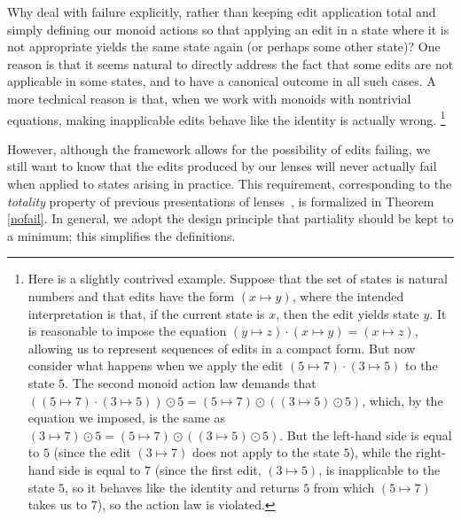 Why deal with failure explicitly, rather than keeping edit application total
and simply defining our monoid actions so that applying an edit in a state
where it is not appropriate yields the same state again (or perhaps some
other state)?  One reason is that it seems natural to directly address the
fact that some edits are not applicable in some states, and to have a
canonical outcome in all such cases.  A more technical reason is that, when
we work with monoids with nontrivial equations, making inapplicable edits
behave like the identity is actually
wrong.%
%
\footnote{Here is a slightly contrived example.  Suppose that the set of
  states is natural numbers and that edits have the form $(x\mapsto y)$,
  where the intended interpretation is that, if the current state is $x$,
  then the edit yields state $y$.  It is reasonable to impose the equation
  $(y\mapsto z)\cdot(x\mapsto y) = (x\mapsto z)$, allowing us to represent
  sequences of edits in a compact form.  But now consider what happens when
  we apply the edit $(5\mapsto 7)\cdot(3\mapsto 5)$ to the state $5$.  The
  second monoid action law demands that $((5\mapsto 7)\cdot(3\mapsto 5))
  \odot 5 = (5\mapsto 7)\odot((3\mapsto 5) \odot 5)$, which, by the equation
  we imposed, is the same as $(3\mapsto 7) \odot 5 = (5\mapsto
  7)\odot((3\mapsto 5) \odot 5)$.  But the left-hand side is equal to $5$
  (since the edit $(3\mapsto 7)$ does not apply to the state $5$), while the
  right-hand side is equal to $7$ (since the first edit, $(3\mapsto 5)$, is
  inapplicable to the state $5$, so it behaves like the identity and returns
  $5$ from which $(5\mapsto 7)$ takes us to $7$), so the action law is
  violated.}

However, although the framework allows for the possibility of edits failing,
we still want to know that the edits produced by our lenses will never
actually fail when applied to \replica states arising in practice.  This
requirement, corresponding to the {\em totality} property of previous
presentations of lenses~\cite{Focal2005}, is formalized in Theorem
\ref{nofail}.  In general, we adopt the design principle that partiality
should be kept to a minimum; this simplifies the definitions.


\iflater
{}
\fi

